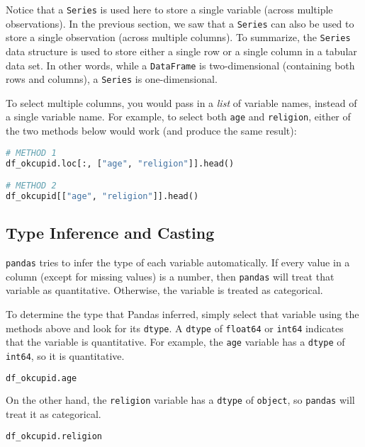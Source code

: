 Notice that a \verb|Series| is used here to store a single variable (across multiple observations). In the previous section, we saw that a \verb|Series| can also be used to store a single observation (across multiple columns). To summarize, the \verb|Series| data structure is used to store either a single row or a single column in a tabular data set. In other words, while a \verb|DataFrame| is two-dimensional (containing both rows and columns), a \verb|Series| is one-dimensional.



To select multiple columns, you would pass in a \textit{list} of variable names, instead of a single variable name. For example, to select both \verb|age| and \verb|religion|, either of the two methods below would work (and produce the same result):

\begin{lstlisting}[language=Python]
# METHOD 1
df_okcupid.loc[:, ["age", "religion"]].head()

# METHOD 2
df_okcupid[["age", "religion"]].head()
\end{lstlisting}




\subsection{Type Inference and Casting}\label{1.3.3}



\verb|pandas| tries to infer the type of each variable automatically. If every value in a column (except for missing values) is a number, then \verb|pandas| will treat that variable as quantitative. Otherwise, the variable is treated as categorical.

To determine the type that Pandas inferred, simply select that variable using the methods above and look for its \verb|dtype|. A \verb|dtype| of \verb|float64| or \verb|int64| indicates that the variable is quantitative.  For example, the \verb|age| variable has a \verb|dtype| of \verb|int64|, so it is quantitative.

\begin{lstlisting}[language=Python]
df_okcupid.age
\end{lstlisting}




On the other hand, the \verb|religion| variable has a \verb|dtype| of \verb|object|, so \verb|pandas| will treat it as categorical.

\begin{lstlisting}[language=Python]
df_okcupid.religion
\end{lstlisting}




